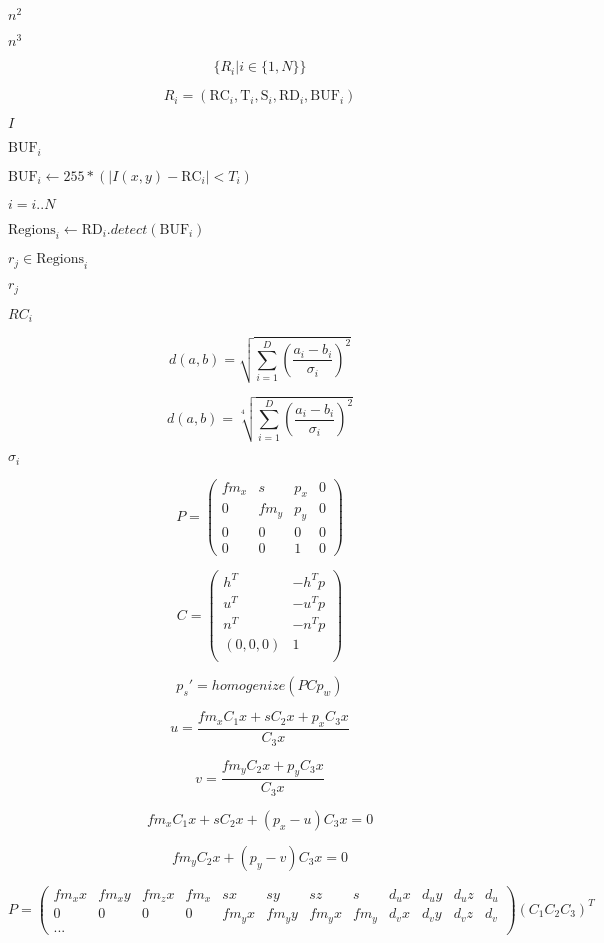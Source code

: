 \documentclass{article}
\begin{document}
$n^2$
\pagebreak

$n^3$
\pagebreak

\[\{R_i | i \in \{1,N\} \}\]
\pagebreak

\[R_i=(\mbox{RC}_i,\mbox{T}_i,\mbox{S}_i,\mbox{RD}_i, \mbox{BUF}_i)\]
\pagebreak

$I$
\pagebreak

$\mbox{BUF}_i$
\pagebreak

$ \mbox{BUF}_i \leftarrow 255 * ( |I(x,y)-\mbox{RC}_i| < T_i )$
\pagebreak

$i = i .. N$
\pagebreak

$\mbox{Regions}_i \leftarrow \mbox{RD}_i.detect(\mbox{BUF}_i)$
\pagebreak

$r_j \in \mbox{Regions}_i$
\pagebreak

$r_j$
\pagebreak

$RC_i$
\pagebreak

\[ d(a,b) = \sqrt{ \sum\limits_{i=1}^D \left( \frac{a_i - b_i}{\sigma_i}\right)^2 } \]
\pagebreak

\[ d(a,b) = \sqrt[4]{ \sum\limits_{i=1}^D \left( \frac{a_i - b_i}{\sigma_i}\right)^2 } \]
\pagebreak

$\sigma_i$
\pagebreak

\[ P = \left(\begin{array}{cccc} fm_x & s & p_x & 0 \\ 0 & f m_y & p_y & 0 \\ 0 & 0 & 0 & 0 \\ 0 & 0 & 1 & 0 \end{array}\right) \]
\pagebreak

\[ C = \left(\begin{array}{cc} h^T & -h^T p \\ u^T & -u^T p \\ n^T & -n^T p \\ (0,0,0) & 1 \\ \end{array}\right) \]
\pagebreak

\[ p_s' = homogenize(P C p_w) \]
\pagebreak

\[ u = \frac{fm_x C_1 x + s C_2 x + p_x C_3 x}{C_3 x} \]
\pagebreak

\[ v = \frac{fm_y C_2 x + p_y C_3 x}{C_3 x} \]
\pagebreak

\[ fm_x C_1 x + s C_2 x + (p_x - u) C_3 x = 0 \]
\pagebreak

\[ fm_y C_2 x + (p_y - v) C_3 x = 0 \]
\pagebreak

\[ P = \left(\begin{array}{cccccccccccc} fm_x x & fm_x y & fm_z x & fm_x & s x & s y & s z & s & d_u x & d_u y & d_u z & d_u \\ 0 & 0 & 0 & 0 & fm_y x & fm_y y & fm_y x & fm_y & d_v x & d_v y & d_v z & d_v \\ ... \end{array}\right) ( C_1 C_2 C_3 )^T \]
\pagebreak
\end{document}
